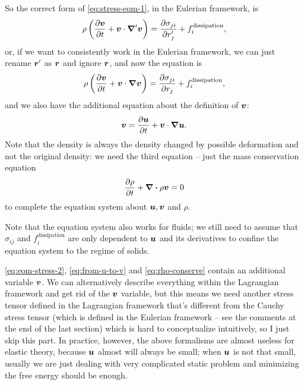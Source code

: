 \documentclass[hyperref, a4paper]{article}
\begin{document}
So the correct form of \eqref{eq:stress-eom-1},
in the Eulerian framework, is 
\begin{equation}
    \rho \left(
        \pdv{\vb*{v}}{t} + \vb*{v} \cdot \grad' \vb*{v}
    \right) = \pdv{\sigma_{ji}}{r_j'} + f_i^{\text{dissipation}},
\end{equation}
or, if we want to consistently work in the Eulerian framework,
we can just rename $\vb*{r}'$ as $\vb*{r}$
and ignore $\vb*{r}$,
and now the equation is 
\begin{equation}
    \rho \left(
        \pdv{\vb*{v}}{t} + \vb*{v} \cdot \grad \vb*{v}
    \right) = \pdv{\sigma_{ji}}{r_j} + f_i^{\text{dissipation}},
    \label{eq:eom-stress-2}
\end{equation}
and we also have the additional equation about the definition of $\vb*{v}$:
\begin{equation}
    \vb*{v} = \pdv{\vb*{u}}{t} + \vb*{v} \cdot \grad \vb*{u}.
    \label{eq:from-u-to-v}
\end{equation}
Note that the density is always the density changed by possible deformation
and not the original density:
we need the third equation -- just the mass conservation equation 
\begin{equation}
    \pdv{\rho}{t} + \div{\rho \vb*{v}} = 0
    \label{eq:rho-conserve}
\end{equation}
to complete the equation system about $\vb*{u}, \vb*{v}$ and $\rho$.

Note that the equation system also works for fluids;
we still need to assume that $\sigma_{ij}$ and $f_i^\text{dissipation}$
are only dependent to $\vb*{u}$ and its derivatives
to confine the equation system to the regime of solids. 

\eqref{eq:eom-stress-2}, \eqref{eq:from-u-to-v} and \eqref{eq:rho-conserve}
contain an additional variable $\vb*{v}$.
We can alternatively describe everything within the Lagrangian framework
and get rid of the $\vb*{v}$ variable,
but this means we need another stress tensor defined in the Lagrangian framework
that's different from the Cauchy stress tensor
(which is defined in the Eulerian framework -- 
see the comments at the end of the last section)
which is hard to conceptualize intuitively,
so I just skip this part.
In practice, however, the above formalisms are almost useless for elastic theory,
because $\vb*{u}$ almost will always be small;
when $\vb*{u}$ is not that small, 
usually we are just dealing with very complicated static problem 
and minimizing the free energy should be enough.
\end{document}
